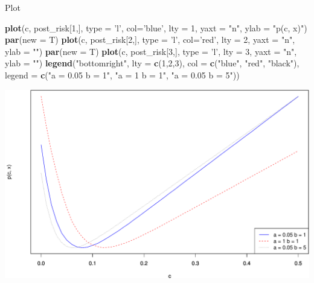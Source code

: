 \documentclass[
  ignorenonframetext,
]{beamer}
\newenvironment{Shaded}{\begin{snugshade}}{\end{snugshade}}
\newcommand{\DataTypeTok}[1]{\textcolor[rgb]{0.13,0.29,0.53}{#1}}
\newcommand{\DecValTok}[1]{\textcolor[rgb]{0.00,0.00,0.81}{#1}}
\newcommand{\KeywordTok}[1]{\textcolor[rgb]{0.13,0.29,0.53}{\textbf{#1}}}
\newcommand{\NormalTok}[1]{#1}
\newcommand{\StringTok}[1]{\textcolor[rgb]{0.31,0.60,0.02}{#1}}
\begin{document}
\begin{frame}[fragile]{Plot}
\protect\hypertarget{plot}{}

\begin{Shaded}
\begin{Highlighting}[]
\KeywordTok{plot}\NormalTok{(c, post_risk[}\DecValTok{1}\NormalTok{,], }\DataTypeTok{type =} \StringTok{'l'}\NormalTok{, }
     \DataTypeTok{col=}\StringTok{'blue'}\NormalTok{, }\DataTypeTok{lty =} \DecValTok{1}\NormalTok{, }\DataTypeTok{yaxt =} \StringTok{"n"}\NormalTok{, }\DataTypeTok{ylab =} \StringTok{"p(c, x)"}\NormalTok{)}
\KeywordTok{par}\NormalTok{(}\DataTypeTok{new =}\NormalTok{ T)}
\KeywordTok{plot}\NormalTok{(c, post_risk[}\DecValTok{2}\NormalTok{,], }\DataTypeTok{type =} \StringTok{'l'}\NormalTok{, }
     \DataTypeTok{col=}\StringTok{'red'}\NormalTok{, }\DataTypeTok{lty =} \DecValTok{2}\NormalTok{, }\DataTypeTok{yaxt =} \StringTok{"n"}\NormalTok{, }\DataTypeTok{ylab =} \StringTok{""}\NormalTok{)}
\KeywordTok{par}\NormalTok{(}\DataTypeTok{new =}\NormalTok{ T)}
\KeywordTok{plot}\NormalTok{(c, post_risk[}\DecValTok{3}\NormalTok{,], }\DataTypeTok{type =} \StringTok{'l'}\NormalTok{, }
     \DataTypeTok{lty =} \DecValTok{3}\NormalTok{, }\DataTypeTok{yaxt =} \StringTok{"n"}\NormalTok{, }\DataTypeTok{ylab =} \StringTok{""}\NormalTok{)}
\KeywordTok{legend}\NormalTok{(}\StringTok{"bottomright"}\NormalTok{, }\DataTypeTok{lty =} \KeywordTok{c}\NormalTok{(}\DecValTok{1}\NormalTok{,}\DecValTok{2}\NormalTok{,}\DecValTok{3}\NormalTok{), }
       \DataTypeTok{col =} \KeywordTok{c}\NormalTok{(}\StringTok{"blue"}\NormalTok{, }\StringTok{"red"}\NormalTok{, }\StringTok{"black"}\NormalTok{), }
       \DataTypeTok{legend =} \KeywordTok{c}\NormalTok{(}\StringTok{"a = 0.05 b = 1"}\NormalTok{, }
                  \StringTok{"a = 1 b = 1"}\NormalTok{, }\StringTok{"a = 0.05 b = 5"}\NormalTok{))}
\end{Highlighting}
\end{Shaded}

\includegraphics{02-intro-to-Bayes_files/figure-beamer/unnamed-chunk-10-1.pdf}

\end{frame}
\end{document}
